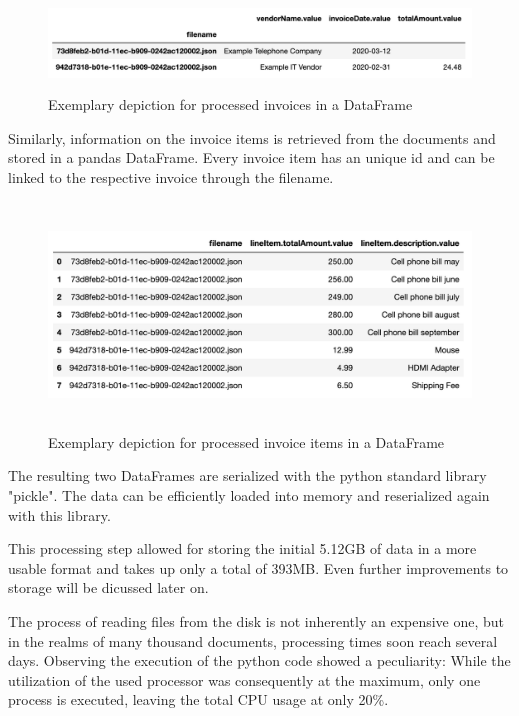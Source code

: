 	\begin{figure}[ht]
		\centering
		\includegraphics[height=2.5cm]{Bilder/practical/df_invoices.png}
		\caption{Exemplary depiction for processed invoices in a DataFrame}
		\label{fig:df-invoices}
	\end{figure}

	Similarly, information on the invoice items is retrieved from the documents and stored in a pandas DataFrame. Every invoice item has an unique id and can be linked to the respective invoice through the filename.
	
	\begin{figure}[ht]
		\centering
		\includegraphics[height=6cm]{Bilder/practical/df_lineitems.png}
		\caption{Exemplary depiction for processed invoice items in a DataFrame}
		\label{fig:df-invoices}
	\end{figure}
	
	The resulting two DataFrames are serialized with the python standard library "pickle".  The data can be efficiently loaded into memory and reserialized again with this library.
	
	This processing step allowed for storing the initial 5.12GB of data in a more usable format and takes up only a total of 393MB. Even further improvements to storage will be dicussed later on.

	The process of reading files from the disk is not inherently an expensive one, but in the realms of many thousand documents, processing times soon reach several days. Observing the execution of the python code showed a peculiarity: While the utilization of the used processor was consequently at the maximum, only one process is executed, leaving the total CPU usage at only 20\%. 
	
